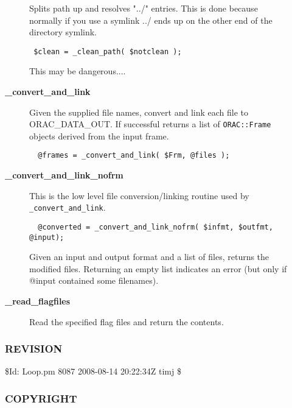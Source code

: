 \begin{description}
\begin{description}
Splits path up and resolves "../" entries. This is done because normally if you
use a symlink ../ ends up on the other end of the directory symlink.

\begin{verbatim}
 $clean = _clean_path( $notclean );
\end{verbatim}


This may be dangerous....


\item[{\textbf{\_convert\_and\_link}}] \mbox{}

Given the supplied file names, convert and link each file to ORAC\_DATA\_OUT.
If successful returns a list of \texttt{ORAC::Frame} objects derived from the input frame.

\begin{verbatim}
  @frames = _convert_and_link( $Frm, @files );
\end{verbatim}

\item[{\textbf{\_convert\_and\_link\_nofrm}}] \mbox{}

This is the low level file conversion/linking routine used by 
\texttt{\_convert\_and\_link}.

\begin{verbatim}
  @converted = _convert_and_link_nofrm( $infmt, $outfmt, @input);
\end{verbatim}


Given an input and output format and a list of files, returns
the modified files. Returning an empty list indicates an error (but
only if @input contained some filenames).


\item[{\textbf{\_read\_flagfiles}}] \mbox{}

Read the specified flag files and return the contents.

\end{description}
\subsubsection*{REVISION\label{ORAC::Loop_REVISION}}


\$Id: Loop.pm 8087 2008-08-14 20:22:34Z timj \$

\subsubsection*{COPYRIGHT\label{ORAC::Loop_COPYRIGHT}}



\end{description}
